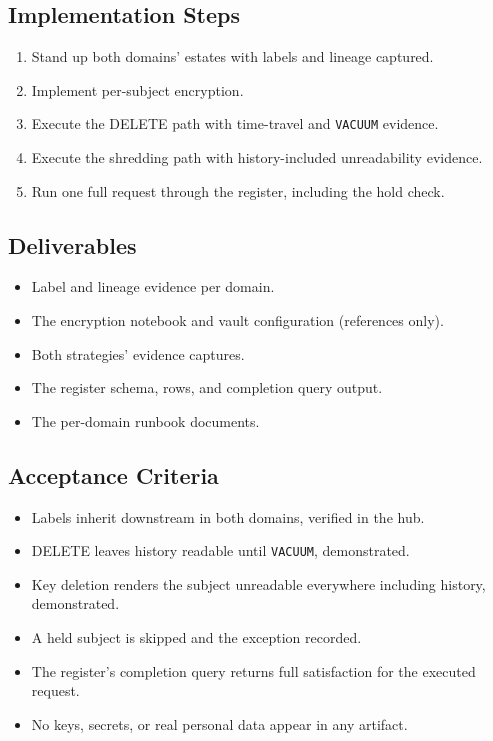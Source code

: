 \subsection*{Implementation Steps}
\begin{enumerate}
    \item Stand up both domains' estates with labels and lineage captured.
    \item Implement per-subject encryption.
    \item Execute the DELETE path with time-travel and \texttt{VACUUM} evidence.
    \item Execute the shredding path with history-included unreadability evidence.
    \item Run one full request through the register, including the hold check.
\end{enumerate}

\subsection*{Deliverables}
\begin{itemize}
    \item Label and lineage evidence per domain.
    \item The encryption notebook and vault configuration (references only).
    \item Both strategies' evidence captures.
    \item The register schema, rows, and completion query output.
    \item The per-domain runbook documents.
\end{itemize}

\subsection*{Acceptance Criteria}
\begin{itemize}
    \item[\(\square\)] Labels inherit downstream in both domains, verified in the hub.
    \item[\(\square\)] DELETE leaves history readable until \texttt{VACUUM}, demonstrated.
    \item[\(\square\)] Key deletion renders the subject unreadable everywhere including history, demonstrated.
    \item[\(\square\)] A held subject is skipped and the exception recorded.
    \item[\(\square\)] The register's completion query returns full satisfaction for the executed request.
    \item[\(\square\)] No keys, secrets, or real personal data appear in any artifact.
\end{itemize}

